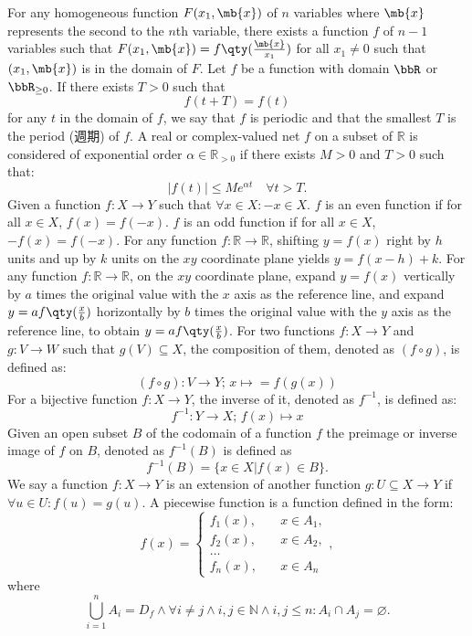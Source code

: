\documentclass[a4paper,12pt]{article}
\begin{document}
For any homogeneous function $F(x_1,\mb{x})$ of $n$ variables where $\mb{x}$ represents the second to the $n$th variable, there exists a function $f$ of $n-1$ variables such that $F(x_1,\mb{x})=f\qty(\frac{\mb{x}}{x_1})$ for all $x_1\neq 0$ such that $(x_1,\mb{x})$ is in the domain of $F$.
Let $f$ be a function with domain $\bbR$ or $\bbR_{\geq 0}$. If there exists $T>0$ such that
\[f(t+T)=f(t)\]
for any $t$ in the domain of $f$, we say that $f$ is periodic and that the smallest $T$ is the period (週期) of $f$.
A real or complex-valued net $f$ on a subset of $\mathbb{R}$ is considered of exponential order $\alpha\in\mathbb{R}_{>0}$ if there exists $M>0$ and $T>0$ such that:
\[|f(t)|\leq Me^{\alpha t}\quad \forall t>T.\]
Given a function $f\colon X\to Y$ such that $\forall x\in X\colon -x\in X$.
$f$ is an even function if for all $x\in X$, $f(x)=f(-x)$.
$f$ is an odd function if for all $x\in X$, $-f(x)=f(-x)$.
For any function $f\colon\mathbb{R}\to\mathbb{R}$, shifting $y=f(x)$ right by $h$ units and up by $k$ units on the $xy$ coordinate plane yields $y=f(x-h)+k$.
For any function $f\colon\mathbb{R}\to\mathbb{R}$, on the $xy$ coordinate plane, expand $y=f(x)$ vertically by $a$ times the original value with the $x$ axis as the reference line, and expand $y=af\qty(\frac{x}{b})$ horizontally by $b$ times the original value with the $y$ axis as the reference line, to obtain $y=af\qty(\frac{x}{b})$.
For two functions $f\colon X\to Y$ and $g\colon V\to W$ such that $g(V)\subseteq X$, the composition of them, denoted as $(f\circ g)$, is defined as:
\[(f \circ g)\colon V\to Y;\,x\mapsto = f(g(x))\]
For a bijective function $f\colon X\to Y$, the inverse of it, denoted as $f^{-1}$, is defined as:
\[f^{-1}\colon Y\to X;\,f(x)\mapsto x\]
Given an open subset $B$ of the codomain of a function $f$ the preimage or inverse image of $f$ on $B$, denoted as $f^{-1}(B)$ is defined as
\[f^{-1}(B)=\{x\in X|f(x)\in B\}.\]
We say a function $f\colon X\to Y$ is an extension of another function $g\colon U\subseteq X\to Y$ if $\forall u\in U\colon f(u)=g(u)$.
A piecewise function is a function defined in the form:
\[f(x) =
\begin{cases}
f_1(x), & \quad x\in A_1, \\
f_2(x), & \quad x\in A_2, \\
\dots  \\
f_n(x), & \quad x \in A_n
\end{cases},\]
where
\[\bigcup_{i=1}^nA_i=D_f\land\forall i\neq j\land i,j\in\mathbb{N}\land i,j\leq n\colon A_i\cap A_j=\varnothing.\]
\end{document}
